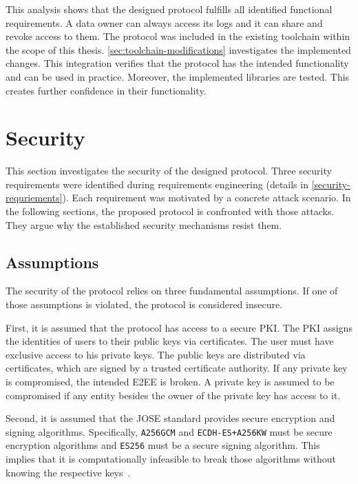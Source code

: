 \documentclass[../main.tex]{subfiles}
\begin{document}
This analysis shows that the designed protocol fulfills all identified functional requirements.
A data owner can always access its logs and it can share and revoke access to them.
The protocol was included in the existing toolchain within the scope of this thesis.
\cref{sec:toolchain-modifications} investigates the implemented changes.
This integration verifies that the protocol has the intended functionality and can be used in practice.
Moreover, the implemented libraries are tested.
This creates further confidence in their functionality.

\section{Security}
\label{sec:evaluation-sec}

This section investigates the security of the designed protocol.
Three security requirements were identified during requirements engineering (details in \cref{security-requriements}).
Each requirement was motivated by a concrete attack scenario.
In the following sections, the proposed protocol is confronted with those attacks.
They argue why the established security mechanisms resist them.

\subsection{Assumptions}

The security of the protocol relies on three fundamental assumptions.
If one of those assumptions is violated, the protocol is considered insecure.

First, it is assumed that the protocol has access to a secure PKI.
The PKI assigns the identities of users to their public keys via certificates.
The user must have exclusive access to his private keys.
The public keys are distributed via certificates, which are signed by a trusted certificate authority.
If any private key is compromised, the intended E2EE is broken.
A private key is assumed to be compromised if any entity besides the owner of the private key has access to it.

Second, it is assumed that the JOSE standard provides secure encryption and signing algorithms.
Specifically, \verb|A256GCM| and \verb|ECDH-ES+A256KW| must be secure encryption algorithms and \verb|ES256| must be a secure signing algorithm.
This implies that it is computationally infeasible to break those algorithms without knowing the respective keys~\cite{Katz2020}.
\end{document}
